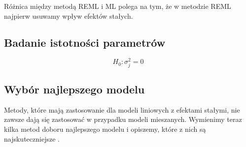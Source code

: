 \documentclass[12pt]{mwbk}
\theoremstyle{plain}
\theoremstyle{definition}
\theoremstyle{remark}
\begin{document}
Różnica między metodą REML i ML polega na tym, że w metodzie REML najpierw usuwamy wpływ efektów stałych.

\subsection{Badanie istotności parametrów}

$$H_0: \sigma^2_j=0$$


\subsection{Wybór najlepszego modelu}

Metody, które mają zastosowanie dla modeli liniowych z efektami stałymi, nie zawsze dają się zastosować w przypadku modeli mieszanych. Wymienimy teraz kilka metod doboru najlepszego modelu i opiszemy, które z nich są najskuteczniejsze \cite{faraway}.
\end{document}
